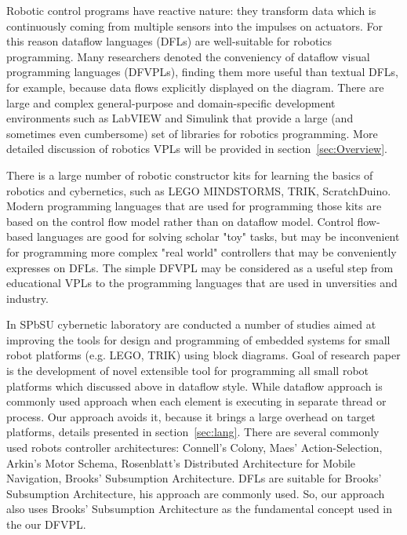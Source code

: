 \documentclass[conference,compsoc]{IEEEtran}
\begin{document}
Robotic control programs have reactive nature: they transform data which is continuously coming from multiple sensors into the impulses on actuators. For this reason dataflow languages (DFLs) are well-suitable for robotics programming. Many researchers denoted the conveniency of dataflow visual programming languages (DFVPLs)\cite{johnston2004advances}, finding them more useful than textual DFLs, for example, because data flows explicitly displayed on the diagram. There are large and complex general-purpose and domain-specific development environments such as LabVIEW\cite{labview} and Simulink\cite{simulink} that provide a large (and sometimes even cumbersome) set of libraries for robotics programming. More detailed discussion of robotics VPLs will be provided in section~\ref{sec:Overview}.

There is a large number of robotic constructor kits for learning the basics of robotics and cybernetics, such as LEGO MINDSTORMS\cite{legokit}, TRIK, ScratchDuino\cite{http://www.scratchduino.com/}. Modern programming languages that are used for programming those kits are based on the control flow model rather than on dataflow model. Control flow-based languages are good for solving scholar "toy" tasks, but may be inconvenient for programming more complex "real world" controllers that may be conveniently expresses on DFLs. The simple DFVPL may be considered as a useful step from educational VPLs to the programming languages that are used in unversities and industry. 

In SPbSU cybernetic laboratory are conducted a number of studies aimed at improving the tools for design and programming of embedded systems for small robot platforms (e.g. LEGO, TRIK) using block diagrams\cite{}. Goal of research paper is the development of novel extensible tool for programming all small robot platforms which discussed above in dataflow style. While dataflow approach is commonly used approach when each element is executing in separate thread or process. Our approach avoids it, because it brings a large overhead on target platforms, details presented in section~\ref{sec:lang}. There are several commonly used robots controller architectures: Connell's Colony, Maes' Action-Selection, Arkin's Motor Schema, Rosenblatt's Distributed Architecture for Mobile Navigation, Brooks' Subsumption Architecture\cite{simpson2009toward}. DFLs are suitable for Brooks' Subsumption Architecture, his approach are commonly used\cite{banyasad2000visual,simpson2006mobile,posso2011process,proetzsch2007behaviour}. So, our approach also uses Brooks’ Subsumption Architecture as the fundamental concept used in the our DFVPL.
\end{document}
